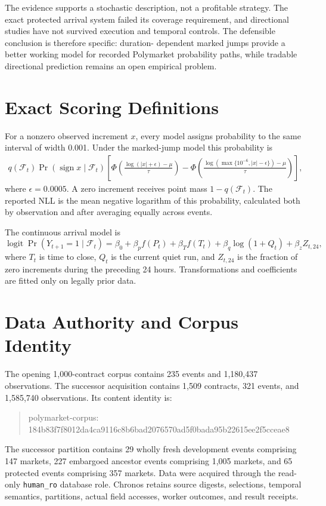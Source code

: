 \documentclass[11pt]{article}
\begin{document}
The evidence supports a stochastic description, not a profitable strategy. The exact protected
arrival system failed its coverage requirement, and directional studies have not survived
execution and temporal controls. The defensible conclusion is therefore specific: duration-
dependent marked jumps provide a better working model for recorded Polymarket probability paths,
while tradable directional prediction remains an open empirical problem.

\clearpage
\appendix

\section{Exact Scoring Definitions}
\label{app:model}

For a nonzero observed increment $x$, every model assigns probability to the same interval of
width 0.001. Under the marked-jump model this probability is
\begin{align}
q(\mathcal F_t)\Pr(\operatorname{sign}x\mid\mathcal F_t)
\left[
\Phi\!\left(\frac{\log(|x|+\epsilon)-\mu}{\tau}\right)
-
\Phi\!\left(\frac{\log(\max\{10^{-6},|x|-\epsilon\})-\mu}{\tau}\right)
\right],
\end{align}
where $\epsilon=0.0005$. A zero increment receives point mass $1-q(\mathcal F_t)$. The reported
NLL is the mean negative logarithm of this probability, calculated both by observation and after
averaging equally across events.

The continuous arrival model is
\begin{equation}
\operatorname{logit}\Pr(Y_{t+1}=1\mid\mathcal F_t)=
\beta_0+\beta_p f(P_t)+\beta_T f(T_t)+\beta_q\log(1+Q_t)+\beta_z Z_{t,24},
\end{equation}
where $T_t$ is time to close, $Q_t$ is the current quiet run, and $Z_{t,24}$ is the fraction of
zero increments during the preceding 24 hours. Transformations and coefficients are fitted only
on legally prior data.

\section{Data Authority and Corpus Identity}
\label{app:data}

The opening 1,000-contract corpus contains 235 events and 1,180,437 observations. The successor
acquisition contains 1,509 contracts, 321 events, and 1,585,740 observations. Its content identity
is:
\begin{quote}\small\ttfamily
polymarket-corpus:\\
184b83f7f8012da4ca9116c8b6bad2076570ad5f0bada95b22615ee2f5cceae8
\end{quote}
The successor partition contains 29 wholly fresh development events comprising 147 markets, 227
embargoed ancestor events comprising 1,005 markets, and 65 protected events comprising 357
markets. Data were acquired through the read-only \texttt{human\_ro} database role. Chronos
retains source digests, selections, temporal semantics, partitions, actual field accesses, worker
outcomes, and result receipts.
\end{document}
